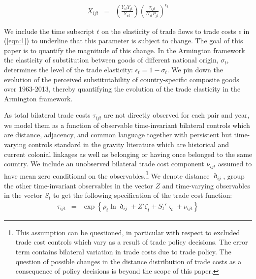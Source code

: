 \documentclass[12pt,twoside,a4paper,notitlepage]{article}
\begin{document}
\begin{eqnarray}
X_{ijt} & = & \left(\frac{Y_{it}Y_{jt}}{Y_{wt}}\right)\left(\frac{\tau_{ijt}}{\Pi_{it}P_{jt}}\right)^{\epsilon_t}\label{eqn:1}
\end{eqnarray}

We include the time subscript $t$ on the elasticity of trade flows to trade costs $\epsilon$ in (\ref{eqn:1}) to underline that this parameter is subject to change. 
The goal of this paper is to quantify the magnitude of this change. 
In the Armington framework the elasticity of substitution between goods of different national origin, $\sigma_t$, determines the level of the trade elasticity: $\epsilon_t=1-\sigma_t$.
We pin down the evolution of the perceived substitutability of country-specific composite goods over 1963-2013, thereby quantifying the evolution of the trade elasticity in the Armington framework.

As total bilateral trade costs $\tau_{ijt}$ are not directly observed for each pair and year, we model them as a function of observable time-invariant bilateral controls which are distance, adjacency, and common language together with persistent but time-varying controls standard in the gravity literature which are historical and current colonial linkages as well as belonging or having once belonged to the same country.
We include an unobserved bilateral trade cost component $\nu_{ijt}$ assumed to have mean zero conditional on the observables.\footnote{ This assumption can be questioned, in particular with respect to excluded trade cost controls which vary as a result of trade policy decisions.
	\fi The error term contains bilateral variation in trade costs due to trade policy.
	The question of possible changes in the distance distribution of trade costs as a consequence of policy decisions is beyond the scope of this paper.}
We denote distance $\eth_{ij}$, group the other time-invariant observables in the vector $Z$ and time-varying observables in the vector $S_t$ to get the following specification of the trade cost function:
\begin{eqnarray}
\tau_{ijt}&=&\exp\left\{\rho_t\ln{\eth_{ij}}+{Z}'\zeta_{t}+{S_t}'\varsigma_{t}+\nu_{ijt}\right\} \label{eqn:20}
\end{eqnarray}
\end{document}
